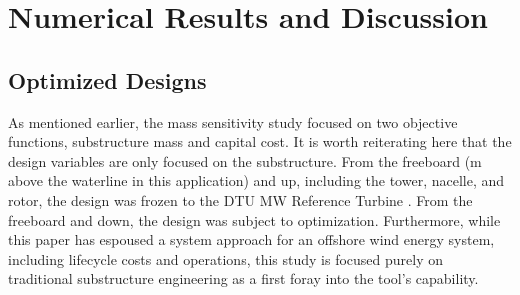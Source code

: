 \section{Numerical Results and Discussion}
\label{sec:results}

\subsection{Optimized Designs}
As mentioned earlier, the mass sensitivity study focused on two
objective functions, substructure mass and capital cost.  It is worth
reiterating here that the design variables are only focused on the
substructure.  From the freeboard (\unit[10]{m} above the waterline in
this application) and up, including the tower, nacelle, and rotor, the
design was frozen to the DTU \unit[10]{MW} Reference Turbine
\citep{dtu10mw}.  From the freeboard and down, the design was subject to
optimization.  Furthermore, while this paper has espoused a system
approach for an offshore wind energy system, including lifecycle costs
and operations, this study is focused purely on traditional substructure
engineering as a first foray into the tool's capability.

